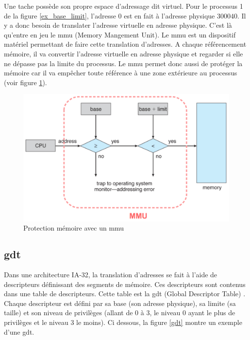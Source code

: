 \documentclass[a4paper, 12pt]{article}
\begin{document}
Une tache possède son propre espace d'adressage dit virtuel. Pour le processus 1
de la figure \ref{ex_base_limit}, l'adresse $0$ est en fait à l'adresse physique
$300040$. Il y a donc besoin de translater l'adresse virtuelle en adresse physique.
C'est là qu'entre en jeu le \acrshort{mmu} (Memory Mangement Unit). Le \acrshort{mmu}
est un dispositif matériel permettant de faire cette translation d'adresses. A chaque
référencement mémoire, il va convertir l'adresse virtuelle en adresse physique et
regarder si elle ne dépasse pas la limite du processus. Le \acrshort{mmu} permet donc
aussi de protéger la mémoire car il va empêcher toute référence à une zone extérieure
au processus (voir figure \ref{mmu}).\cite{ref42}

\begin{figure}[!h]
  \centering
  \includegraphics[scale=0.4]{images/mmu.png}
  \caption{Protection mémoire avec un \acrshort{mmu}}
  \label{mmu}
\end{figure}


\subsection{\acrshort{gdt}}
Dans une architecture \acrshort{IA-32}, la translation d'adresses se fait à l'aide
de descripteurs définissant des segments de mémoire. Ces descripteurs sont contenus
dans une table de descripteurs. Cette table est la \acrshort{gdt} (Global Descriptor
Table) \cite{ref14}. Chaque descripteur est défini par sa base (son adresse physique),
sa limite (sa taille) et son niveau de privilèges (allant de 0 à 3, le niveau 0 
ayant le plus de privilèges et le niveau 3 le moins). Ci dessous, la figure \ref{gdt}
montre un exemple d'une \acrshort{gdt}.\cite{ref42}
\end{document}
